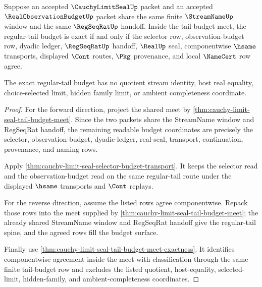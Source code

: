 \begin{theorem}
\label{thm:cauchy-limit-seal-regular-tail-budget-exactness}
Suppose an accepted $\CauchyLimitSealUp$ packet and an accepted $\RealObservationBudgetUp$ packet share the same finite $\StreamNameUp$ window and the same $\RegSeqRatUp$ handoff. Inside the tail-budget meet, the regular-tail budget is exact if and only if the selector row, observation-budget row, dyadic ledger, $\RegSeqRatUp$ handoff, $\RealUp$ seal, componentwise $\hsame$ transports, displayed $\Cont$ routes, $\Pkg$ provenance, and local $\NameCert$ row agree.

The exact regular-tail budget has no quotient stream identity, host real equality, choice-selected limit, hidden family limit, or ambient completeness coordinate.
\end{theorem}
\begin{proof}
For the forward direction, project the shared meet by \autoref{thm:cauchy-limit-seal-tail-budget-meet}. Since the two packets share the StreamName window and RegSeqRat handoff, the remaining readable budget coordinates are precisely the selector, observation-budget, dyadic-ledger, real-seal, transport, continuation, provenance, and naming rows.

Apply \autoref{thm:cauchy-limit-seal-selector-budget-transport}. It keeps the selector read and the observation-budget read on the same regular-tail route under the displayed $\hsame$ transports and $\Cont$ replays.

For the reverse direction, assume the listed rows agree componentwise. Repack those rows into the meet supplied by \autoref{thm:cauchy-limit-seal-tail-budget-meet}; the already shared StreamName window and RegSeqRat handoff give the regular-tail spine, and the agreed rows fill the budget surface.

Finally use \autoref{thm:cauchy-limit-seal-tail-budget-meet-exactness}. It identifies componentwise agreement inside the meet with classification through the same finite tail-budget row and excludes the listed quotient, host-equality, selected-limit, hidden-family, and ambient-completeness coordinates.
\end{proof}

